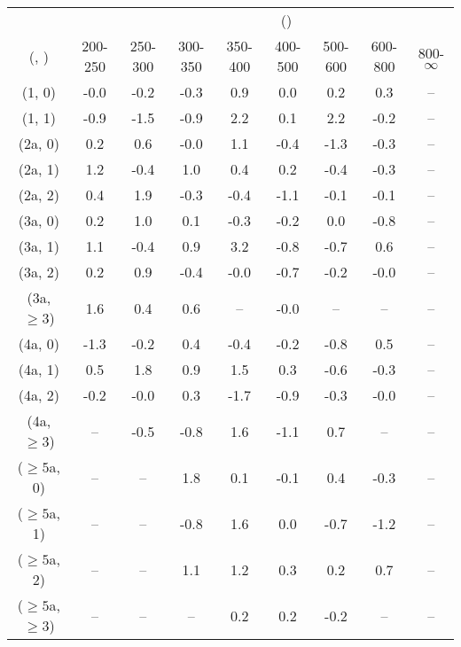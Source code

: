 \begin{table}[h!]
\tiny
\centering
{}
\begin{tabular}
{ccccccccc}
	\hline\hline
&	& \multicolumn{8}{c}{\scalht (\gev)} \\ 
	 (\njet,  \nb) & 200-250 & 250-300 & 300-350 & 350-400 & 400-500 & 500-600 & 600-800 & 800-$\infty$ \\ [0.8ex] 
\hline
	(1, 0) & -0.0 & -0.2 & -0.3 & 0.9 & 0.0 & 0.2 & 0.3 & -- \\[0.5ex] 
	(1, 1) & -0.9 & -1.5 & -0.9 & 2.2 & 0.1 & 2.2 & -0.2 & -- \\[0.5ex] 
	(2a, 0) & 0.2 & 0.6 & -0.0 & 1.1 & -0.4 & -1.3 & -0.3 & -- \\[0.5ex] 
	(2a, 1) & 1.2 & -0.4 & 1.0 & 0.4 & 0.2 & -0.4 & -0.3 & -- \\[0.5ex] 
	(2a, 2) & 0.4 & 1.9 & -0.3 & -0.4 & -1.1 & -0.1 & -0.1 & -- \\[0.5ex] 
	(3a, 0) & 0.2 & 1.0 & 0.1 & -0.3 & -0.2 & 0.0 & -0.8 & -- \\[0.5ex] 
	(3a, 1) & 1.1 & -0.4 & 0.9 & 3.2 & -0.8 & -0.7 & 0.6 & -- \\[0.5ex] 
	(3a, 2) & 0.2 & 0.9 & -0.4 & -0.0 & -0.7 & -0.2 & -0.0 & -- \\[0.5ex] 
	(3a, $\ge3$) & 1.6 & 0.4 & 0.6 & -- & -0.0 & -- & -- & -- \\[0.5ex] 
	(4a, 0) & -1.3 & -0.2 & 0.4 & -0.4 & -0.2 & -0.8 & 0.5 & -- \\[0.5ex] 
	(4a, 1) & 0.5 & 1.8 & 0.9 & 1.5 & 0.3 & -0.6 & -0.3 & -- \\[0.5ex] 
	(4a, 2) & -0.2 & -0.0 & 0.3 & -1.7 & -0.9 & -0.3 & -0.0 & -- \\[0.5ex] 
	(4a, $\ge3$) & -- & -0.5 & -0.8 & 1.6 & -1.1 & 0.7 & -- & -- \\[0.5ex] 
	($\ge5$a, 0) & -- & -- & 1.8 & 0.1 & -0.1 & 0.4 & -0.3 & -- \\[0.5ex] 
	($\ge5$a, 1) & -- & -- & -0.8 & 1.6 & 0.0 & -0.7 & -1.2 & -- \\[0.5ex] 
	($\ge5$a, 2) & -- & -- & 1.1 & 1.2 & 0.3 & 0.2 & 0.7 & -- \\[0.5ex] 
	($\ge5$a, $\ge3$) & -- & -- & -- & 0.2 & 0.2 & -0.2 & -- & -- \\[0.5ex] 
	\hline
	\hline
\end{tabular}
\end{table}
